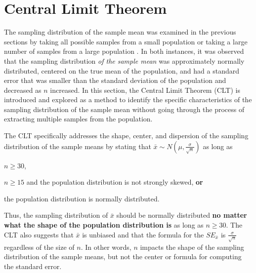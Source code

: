 \documentclass[10pt,openany]{book}\usepackage[]{graphicx}\usepackage[]{color}
\begin{document}


\section{Central Limit Theorem} \label{sect:CLT}
The sampling distribution of the sample mean was examined in the previous sections by taking all possible samples from a small population  or taking a large number of samples from a large population . In both instances, it was observed that the sampling distribution \textit{of the sample mean} was approximately normally distributed, centered on the true mean of the population, and had a standard error that was smaller than the standard deviation of the population and decreased as $n$ increased. In this section, the Central Limit Theorem (CLT) is introduced and explored as a method to identify the specific characteristics of the sampling distribution of the sample mean without going through the process of extracting multiple samples from the population.

The CLT specifically addresses the shape, center, and dispersion of the sampling distribution of the sample means by stating that $\bar{x}\sim N\left(\mu,\frac{\sigma}{\sqrt{n}}\right)$ as long as

\vspace*{-12pt}
\begin{Itemize}
  \item $n\geq30$,
  \item $n\geq15$ and the population distribution is not strongly skewed, \textbf{or}
  \item the population distribution is normally distributed.
\end{Itemize}
\vspace*{-12pt}

Thus, the sampling distribution of $\bar{x}$ should be normally distributed \textbf{no matter what the shape of the population distribution is} as long as $n\geq30$. The CLT also suggests that $\bar{x}$ is unbiased and that the formula for the $SE_{\bar{x}}$ is $\frac{\sigma}{\sqrt{n}}$ regardless of the size of $n$. In other words, $n$ impacts the shape of the sampling distribution of the sample means, but not the center or formula for computing the standard error.
\end{document}
